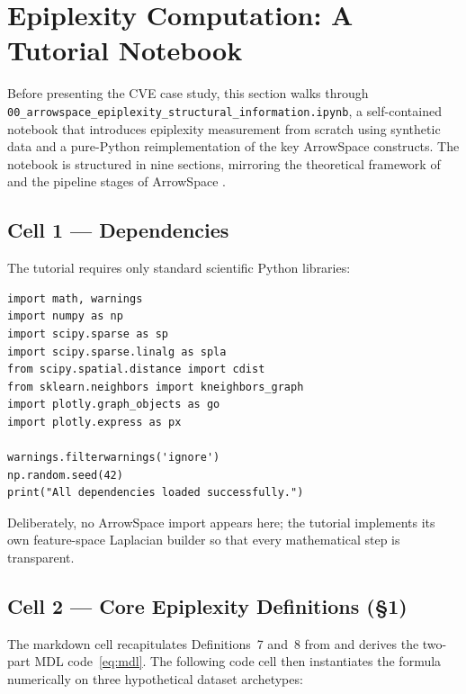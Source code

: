 \documentclass[12pt,a4paper]{article}
\theoremstyle{plain}
\theoremstyle{definition}
\theoremstyle{remark}
\newcommand{\1}{\mathbf{1}}
\begin{document}
	\section{Epiplexity Computation: A Tutorial Notebook}
	\label{sec:prelim}
	
	Before presenting the CVE case study, this section walks through\\
	\texttt{00\_arrowspace\_epiplexity\_structural\_information.ipynb}, a
	self-contained notebook that introduces epiplexity measurement from
	scratch using synthetic data and a pure-Python reimplementation of the
	key ArrowSpace constructs.
	The notebook is structured in nine sections, mirroring the theoretical
	framework of~\cite{finzi2026epiplexity} and the pipeline stages of
	ArrowSpace \citep{Moriondo2025ArrowSpace}.
	
	\subsection{Cell 1 --- Dependencies}
	
	The tutorial requires only standard scientific Python libraries:
	
	\begin{lstlisting}[caption={Tutorial notebook: dependency cell},
	label={lst:deps00}]
import math, warnings
import numpy as np
import scipy.sparse as sp
import scipy.sparse.linalg as spla
from scipy.spatial.distance import cdist
from sklearn.neighbors import kneighbors_graph
import plotly.graph_objects as go
import plotly.express as px

warnings.filterwarnings('ignore')
np.random.seed(42)
print("All dependencies loaded successfully.")
	\end{lstlisting}
	
	Deliberately, no ArrowSpace import appears here; the tutorial implements
	its own feature-space Laplacian builder so that every mathematical step
	is transparent.
	
	\subsection{Cell 2 --- Core Epiplexity Definitions (§1)}
	
	The markdown cell recapitulates Definitions~7 and~8 from
	\cite{finzi2026epiplexity} and derives the two-part MDL
	code~\eqref{eq:mdl}.
	The following code cell then instantiates the formula numerically on
	three hypothetical dataset archetypes:
	
\end{document}
